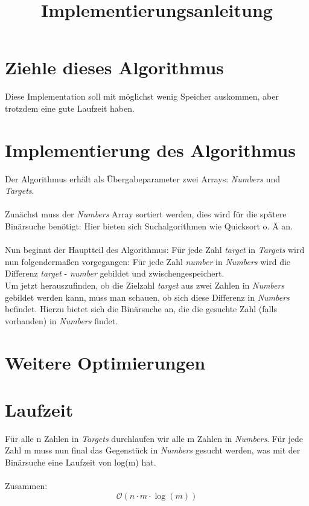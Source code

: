 \documentclass[a4paper, 11pt]{article}
\title{Implementierungsanleitung}
\author{}
\date{}
\begin{document}
    \maketitle

    \section{Ziehle dieses Algorithmus}
    Diese Implementation soll mit möglichst wenig Speicher auskommen, aber trotzdem eine gute Laufzeit haben.


    \section{Implementierung des Algorithmus}
    Der Algorithmus erhält als Übergabeparameter zwei Arrays: \textit{Numbers} und \textit{Targets}.\\\\
    Zunächst muss der \textit{Numbers} Array sortiert werden, dies wird für die spätere Binärsuche benötigt: Hier bieten sich Suchalgorithmen wie Quicksort o. Ä an.\\\\
    Nun beginnt der Hauptteil des Algorithmus: Für jede Zahl \textit{target} in \textit{Targets} wird nun folgendermaßen vorgegangen: Für jede Zahl \textit{number} in \textit{Numbers} wird die Differenz \textit{target} - \textit{number} gebildet und zwischengespeichert.\\
    Um jetzt herauszufinden, ob die Zielzahl \textit{target} aus zwei Zahlen in \textit{Numbers} gebildet werden kann, muss man schauen, ob sich diese Differenz in \textit{Numbers} befindet. Hierzu bietet sich die Binärsuche an, die die gesuchte Zahl (falls vorhanden) in \textit{Numbers} findet.

    \section{Weitere Optimierungen}



    \section{Laufzeit}
    Für alle n Zahlen in \textit{Targets} durchlaufen wir alle m Zahlen in \textit{Numbers}. Für jede Zahl m muss nun final das Gegenstück in \textit{Numbers} gesucht werden, was mit der Binärsuche eine Laufzeit von log(m) hat.\\\\
    Zusammen: \[
                  \mathcal{O}\left(n \cdot m \cdot \log(m)\right)
    \]

\end{document}
